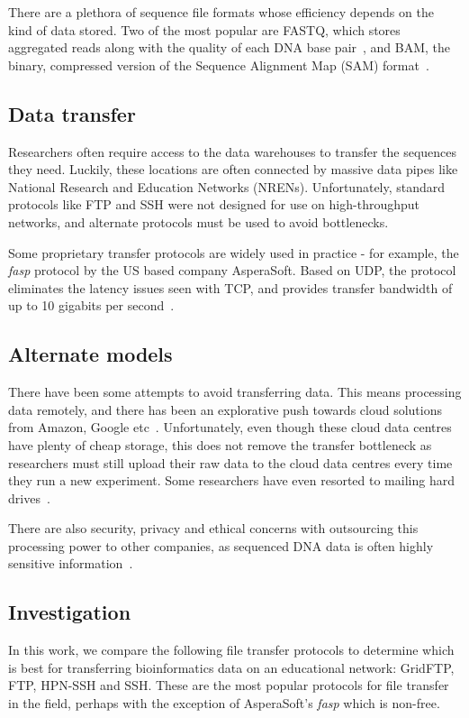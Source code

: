 \documentclass{sig-alternate-05-2015}
\begin{document}
There are a plethora of sequence file formats whose efficiency depends on the kind of data stored. Two of the most popular are FASTQ, which stores aggregated reads along with the quality of each DNA base pair~\cite{cock2010sanger}, and BAM, the binary, compressed version of the Sequence Alignment Map (SAM) format~\cite{SAMspec}.

\subsection{Data transfer}
Researchers often require access to the data warehouses to transfer the sequences they need. Luckily, these locations are often connected by massive data pipes like National Research and Education Networks (NRENs). Unfortunately, standard protocols like FTP and SSH were not designed for use on high-throughput networks, and alternate protocols must be used to avoid bottlenecks.

Some proprietary transfer protocols are widely used in practice - for example, the \textit{fasp} protocol by the US based company AsperaSoft. Based on UDP, the protocol eliminates the latency issues seen with TCP, and provides transfer bandwidth of up to 10 gigabits per second~\cite{beloslyudtsev2014aspera}.

\subsection{Alternate models}
There have been some attempts to avoid transferring data. This means processing data remotely, and there has been an explorative push towards cloud solutions from Amazon, Google etc~\cite{baker2010next}. Unfortunately, even though these cloud data centres have plenty of cheap storage, this does not remove the transfer bottleneck as researchers must still upload their raw data to the cloud data centres every time they run a new experiment. Some researchers have even resorted to mailing hard drives~\cite{baker2010next}.

There are also security, privacy and ethical concerns with outsourcing this processing power to other companies, as sequenced DNA data is often highly sensitive information~\cite{marx2013biology}.

\subsection{Investigation}
In this work, we compare the following file transfer protocols to determine which is best for transferring bioinformatics data on an educational network: GridFTP, FTP, HPN-SSH and SSH.
These are the most popular protocols for file transfer in the field, perhaps with the exception of AsperaSoft's \textit{fasp} which is non-free. 
\end{document}
